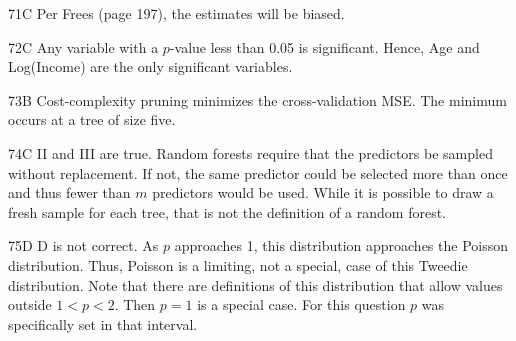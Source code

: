 \begin{solution}{71}{C}
Per Frees (page 197), the estimates will be biased.
\end{solution}

\begin{solution}{72}{C}
Any variable with a $p$-value less than 0.05 is significant. Hence, Age and Log(Income) are the only significant variables.
\end{solution}

\begin{solution}{73}{B}
Cost-complexity pruning minimizes the cross-validation MSE. The minimum occurs at a tree of size five.
\end{solution}

\begin{solution}{74}{C}
II and III are true. Random forests require that the predictors be sampled without replacement. If not, the same predictor could be selected more than once and thus fewer than $m$ predictors would be used. While it is possible to draw a fresh sample for each tree, that is not the definition of a random forest.
\end{solution}

\begin{solution}{75}{D}
D is not correct. As $p$ approaches 1, this distribution approaches the Poisson distribution. Thus, Poisson is a limiting, not a special, case of this Tweedie distribution. Note that there are definitions of this distribution that allow values outside $1 < p < 2$. Then $p = 1$ is a special case. For this question $p$ was specifically set in that interval.
\end{solution}